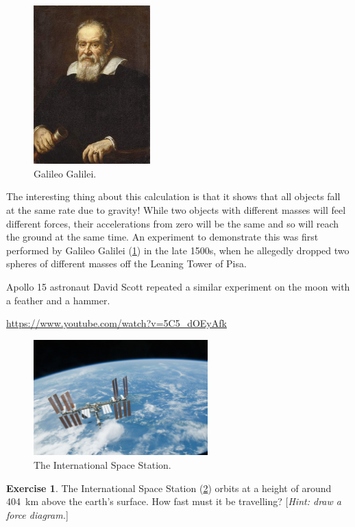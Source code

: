\documentclass[a4paper]{amsbook}
\newcommand{\goandwatch}[1]{
\begin{center}
\begin{tcolorbox}[width=0.8\textwidth,colback={SkyBlue!20},title={\textbf{Go and watch...}},colbacktitle=MidnightBlue,coltitle=White]
  \textcolor{MidnightBlue}{\url{#1}}
\end{tcolorbox}
\end{center}}
\theoremstyle{definition}
\newtheorem{exercise}{Exercise}
\numberwithin{exercise}{chapter}
\numberwithin{exercise}{chapter}
\newcommand\capcite[1]{}
\begin{document}
\begin{figure}
  \centering
  \includegraphics[width=0.4\textwidth]{galileo}
  \caption{Galileo Galilei. \capcite{https://media1.britannica.com/eb-media/58/95758-004-BD98B43B.jpg}\label{fig:galileo}}
\end{figure}

The interesting thing about this calculation is that it shows that all objects fall at the same rate due to gravity! While two objects with
different masses will feel different forces, their accelerations from zero will be the same and so will reach the ground at the same time. An
experiment to demonstrate this was first performed by Galileo Galilei (\cref{fig:galileo}) in the late 1500s, when he allegedly dropped two
spheres of different masses off the Leaning Tower of Pisa.

Apollo 15 astronaut David Scott repeated a similar experiment on the moon with a feather and a hammer.

\goandwatch{https://www.youtube.com/watch?v=5C5_dOEyAfk}

\begin{figure}
  \centering
  \includegraphics[width=0.6\textwidth]{iss}
  \caption{The International Space Station.\label{fig:iss}}
\end{figure}
\begin{exercise}
  The International Space Station (\cref{fig:iss}) orbits at a height of around \SI{404}{\kilo\metre} above the earth's surface. How
  fast must it be travelling?  [\emph{Hint: draw a force diagram.}]
\end{exercise}
\end{document}
